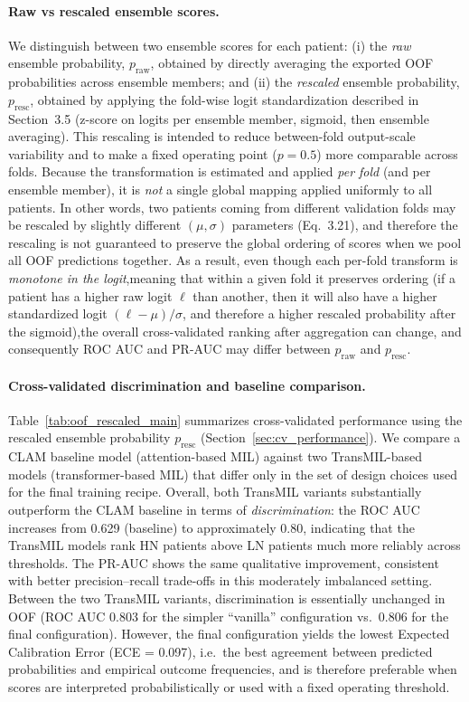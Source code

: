 \paragraph{Raw vs rescaled ensemble scores.}
We distinguish between two ensemble scores for each patient:
(i) the \emph{raw} ensemble probability, $p_{\mathrm{raw}}$, obtained by directly averaging the exported OOF probabilities across ensemble members; and
(ii) the \emph{rescaled} ensemble probability, $p_{\mathrm{resc}}$, obtained by applying the fold-wise logit standardization described in Section~3.5 (z-score on logits per ensemble member, sigmoid, then ensemble averaging).
This rescaling is intended to reduce between-fold output-scale variability and to make a fixed operating point ($p=0.5$) more comparable across folds.
Because the transformation is estimated and applied \emph{per fold} (and per ensemble member), it is \emph{not} a single global mapping applied uniformly to all patients. In other words, two patients coming from different validation folds may be rescaled by slightly different $(\mu,\sigma)$ parameters (Eq.~3.21), and therefore the rescaling is not guaranteed to preserve the global ordering of scores when we pool all OOF predictions together. As a result, even though each per-fold transform is \emph{monotone in the logit},meaning that within a given fold it preserves ordering (if a patient has a higher raw logit $\ell$ than another, then it will also have a higher standardized logit $(\ell-\mu)/\sigma$, and therefore a higher rescaled probability after the sigmoid),the overall cross-validated ranking after aggregation can change, and consequently ROC AUC and PR-AUC may differ between $p_{\mathrm{raw}}$ and $p_{\mathrm{resc}}$.

\paragraph{Cross-validated discrimination and baseline comparison.}
Table~\ref{tab:oof_rescaled_main} summarizes cross-validated performance using the rescaled ensemble probability $p_{\mathrm{resc}}$ (Section~\ref{sec:cv_performance}). We compare a CLAM baseline model (attention-based MIL) against two TransMIL-based models (transformer-based MIL) that differ only in the set of design choices used for the final training recipe.
Overall, both TransMIL variants substantially outperform the CLAM baseline in terms of \emph{discrimination}: the ROC AUC increases from 0.629 (baseline) to approximately 0.80, indicating that the TransMIL models rank HN patients above LN patients much more reliably across thresholds. The PR-AUC shows the same qualitative improvement, consistent with better precision--recall trade-offs in this moderately imbalanced setting.
Between the two TransMIL variants, discrimination is essentially unchanged in OOF (ROC AUC 0.803 for the simpler ``vanilla'' configuration vs.\ 0.806 for the final configuration). However, the final configuration yields the lowest Expected Calibration Error (ECE = 0.097), i.e.\ the best agreement between predicted probabilities and empirical outcome frequencies, and is therefore preferable when scores are interpreted probabilistically or used with a fixed operating threshold.


